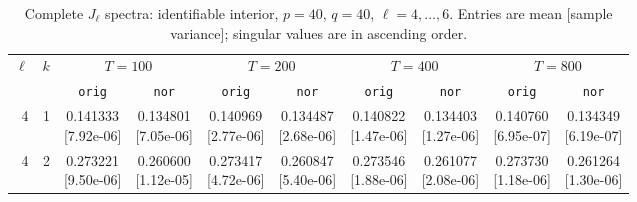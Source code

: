 \documentclass[12pt,letterpaper]{article}
\def\spacingset#1{\renewcommand{\baselinestretch}{#1}\small\normalsize}
\theoremstyle{plain}
\theoremstyle{definition}
\begin{document}
\clearpage
\begin{table}[p]
\begingroup
\spacingset{1.0}
\small\centering
\caption{Complete $J_\ell$ spectra: identifiable interior, $p=40$, $q=40$, $\ell=4,\ldots,6$. Entries are mean [sample variance]; singular values are in ascending order.}
\label{s23:lambda:alltab:spectra:p40q40interior:4-6}
\footnotesize
\setlength{\tabcolsep}{2.2pt}
\renewcommand{\arraystretch}{1.03}
\begin{adjustbox}{max width=\linewidth}
\begin{tabular}{@{}rr*{8}{c}@{}}
\toprule
$\ell$ & $k$ & \multicolumn{2}{c}{$T=100$} & \multicolumn{2}{c}{$T=200$} & \multicolumn{2}{c}{$T=400$} & \multicolumn{2}{c}{$T=800$}\\
\cmidrule(lr){3-4}\cmidrule(lr){5-6}\cmidrule(lr){7-8}\cmidrule(lr){9-10}
 &  & \texttt{orig} & \texttt{nor} & \texttt{orig} & \texttt{nor} & \texttt{orig} & \texttt{nor} & \texttt{orig} & \texttt{nor}\\
\midrule
4 & 1 & \shortstack{0.141333\\[-1pt]{\scriptsize[7.92e-06]}} & \shortstack{0.134801\\[-1pt]{\scriptsize[7.05e-06]}} & \shortstack{0.140969\\[-1pt]{\scriptsize[2.77e-06]}} & \shortstack{0.134487\\[-1pt]{\scriptsize[2.68e-06]}} & \shortstack{0.140822\\[-1pt]{\scriptsize[1.47e-06]}} & \shortstack{0.134403\\[-1pt]{\scriptsize[1.27e-06]}} & \shortstack{0.140760\\[-1pt]{\scriptsize[6.95e-07]}} & \shortstack{0.134349\\[-1pt]{\scriptsize[6.19e-07]}}\\
4 & 2 & \shortstack{0.273221\\[-1pt]{\scriptsize[9.50e-06]}} & \shortstack{0.260600\\[-1pt]{\scriptsize[1.12e-05]}} & \shortstack{0.273417\\[-1pt]{\scriptsize[4.72e-06]}} & \shortstack{0.260847\\[-1pt]{\scriptsize[5.40e-06]}} & \shortstack{0.273546\\[-1pt]{\scriptsize[1.88e-06]}} & \shortstack{0.261077\\[-1pt]{\scriptsize[2.08e-06]}} & \shortstack{0.273730\\[-1pt]{\scriptsize[1.18e-06]}} & \shortstack{0.261264\\[-1pt]{\scriptsize[1.30e-06]}}\\

\end{tabular}
\end{adjustbox}
\end{table}
\end{document}
